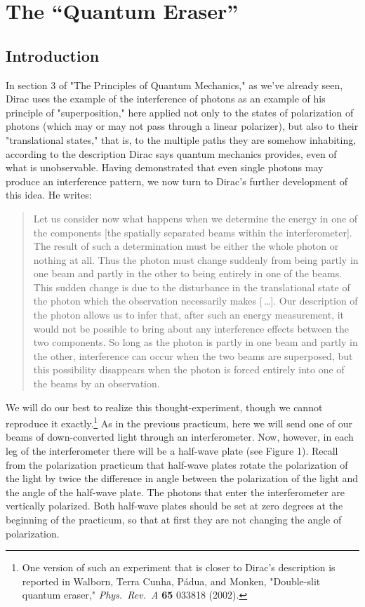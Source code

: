 \chapter{The ``Quantum Eraser''}



\section*{Introduction}

In section 3 of "The Principles of Quantum Mechanics," as we've already seen, Dirac uses the example of the interference of photons as an example of his principle of "superposition," here applied not only to the states of polarization of photons (which may or may not pass through a linear polarizer), but also to their "translational states," that is, to the multiple paths they are somehow inhabiting, according to the description Dirac says quantum mechanics provides, even of what is unobservable. Having demonstrated that even single photons may produce an interference pattern, we now turn to Dirac's further development of this idea. He writes:
\begin{quote}
Let us consider now what happens when we determine the energy in one of the components [the spatially separated beams within the interferometer]. The result of such a determination must be either the whole photon or nothing at all. Thus the photon must change suddenly from being partly in one beam and partly in the other to being entirely in one of the beams. This sudden change is due to the disturbance in the translational state of the photon which the observation necessarily makes [\,\ldots]. Our description of the photon allows us to infer that, after such an energy measurement, it would not be possible to bring about any interference effects between the two components. So long as the photon is partly in one beam and partly in the other, interference can occur when the two beams are superposed, but this possibility disappears when the photon is forced entirely into one of the beams by an observation. 
\end{quote}
We will do our best to realize this thought-experiment, though we cannot reproduce it exactly.\footnote{One version of such an experiment that is closer to Dirac's description is reported in Walborn, Terra Cunha, Pádua, and Monken, "Double-slit quantum eraser," \emph{Phys.\ Rev.\ A} \textbf{65} 033818 (2002).} As in the previous practicum, here we will send one of our beams of down-converted light through an interferometer.  Now, however, in each leg of the interferometer there will be a half-wave plate (see Figure 1).  Recall from the polarization practicum that half-wave plates rotate the polarization of the light by twice the difference in angle between the polarization of the light and the angle of the half-wave plate. The photons that enter the interferometer are vertically polarized.  Both half-wave plates should be set at zero degrees at the beginning of the practicum, so that at first they are not changing the angle of polarization.

